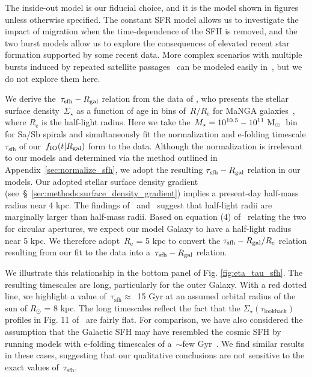 \documentclass[draft2.tex]{subfiles}
\begin{document}
The inside-out model is our fiducial choice, and it is the model shown in 
figures unless otherwise specified. 
The constant SFR model allows us to investigate the impact of migration when 
the time-dependence of the SFH is removed, and the two burst models allow us to 
explore the consequences of elevated recent star formation supported by some 
recent data. 
More complex scenarios with multiple bursts induced by repeated satellite 
passages~\citep[e.g.][]{Lian2020a, Lian2020b, RuizLara2020, Sysoliatina2021} 
can be modeled easily in~\vice, but we do not explore them here. 
\par 
We derive the~$\tau_\text{sfh}-R_\text{gal}$ relation from the data of 
\citet{Sanchez2020}, who presents the stellar surface density~$\Sigma_\star$ as 
a function of age in bins of~$R/R_\text{e}$ for MaNGA 
galaxies~\citep{Bundy2015}, where $R_\text{e}$ is the half-light radius. 
Here we take the~$M_\star = 10^{10.5} - 10^{11}~\text{M}_\odot$~bin for Sa/Sb spirals 
and simultaneously fit the normalization and e-folding timescale 
$\tau_\text{sfh}$ of our~$f_\text{IO}(t|R_\text{gal})$ form to the data. 
Although the normalization is irrelevant to our models and determined via the 
method outlined in Appendix~\ref{sec:normalize_sfh}, we adopt the resulting 
$\tau_\text{sfh}-R_\text{gal}$ relation in our models. 
Our adopted stellar surface density gradient 
(see~\S~\ref{sec:methods:surface_density_gradient}) implies a present-day 
half-mass radius near 4 kpc. 
The findings of~\citet{Garcia-Benito2017} and~\citet{GonzalezDelgado2014} 
suggest that half-light radii are marginally larger than half-mass radii. 
Based on equation (4) of~\citet{GonzalezDelgado2014} relating the two for 
circular apertures, we expect our model Galaxy to have a 
half-light radius near 5 kpc. 
We therefore adopt~$R_\text{e}$ = 5 kpc to convert the 
$\tau_\text{sfh}-R_\text{gal}/R_\text{e}$ relation resulting from our fit to the 
\citet{Sanchez2020} data into a~$\tau_\text{sfh}-R_\text{gal}$ relation. 
\par 
We illustrate this relationship in the bottom panel of Fig. 
\ref{fig:eta_tau_sfh}. 
The resulting timescales are long, particularly for the outer Galaxy. 
With a red dotted line, we highlight a value of~$\tau_\text{sfh} \approx$~15 
Gyr at an assumed orbital radius of the sun of $R_\odot$ = 8 kpc. 
The long timescales reflect the fact that the 
$\Sigma_\star(\tau_\text{lookback})$ profiles in Fig. 11 of~\citet{Sanchez2020} 
are fairly flat. 
For comparison, we have also considered the assumption that the Galactic SFH 
may have resembled the cosmic SFH by running models with e-folding timescales 
of a~$\sim$few Gyr~\citep[e.g.][]{Madau2014}. 
We find similar results in these cases, suggesting that our qualitative 
conclusions are not sensitive to the exact values of~$\tau_\text{sfh}$. 
\end{document}
